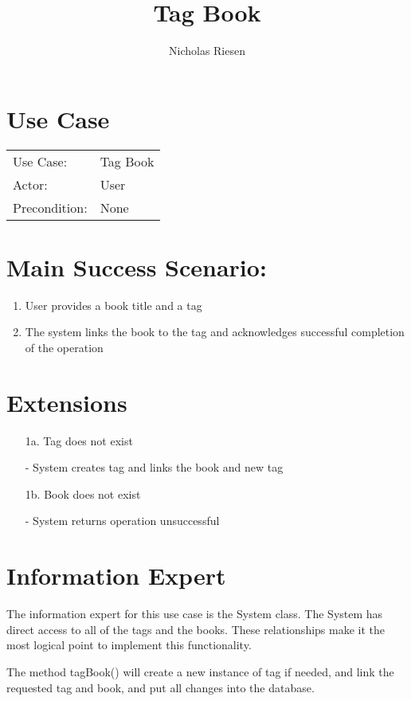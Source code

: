 \documentclass{article}
\title{Tag Book}
\author{Nicholas Riesen}
\begin{document}
\maketitle

\section*{Use Case}
 \begin{tabular}{l l}
 
Use Case:     & Tag Book \\
Actor:        & User     \\
Precondition: & None     \\
\end{tabular}

\section*{Main Success Scenario:}
\begin{enumerate}
    \item User provides a book title and a tag
    \item The system links the book to the tag and  acknowledges successful completion of the operation
\end{enumerate}

\section*{Extensions}
\begin{itemize}
    \item[1a.] Tag does not exist

    - System creates tag and links the book and new tag

    \item[1b.] Book does not exist
    
    - System returns operation unsuccessful
\end{itemize}

\section*{Information Expert}
The information expert for this use case is the System class. The System has
direct access to all of the tags and the books. These relationships make it the
most logical point to implement this functionality.


The method tagBook() will create a new instance of tag if needed, and link the
requested tag and book, and put all changes into the database.
\end{document}

